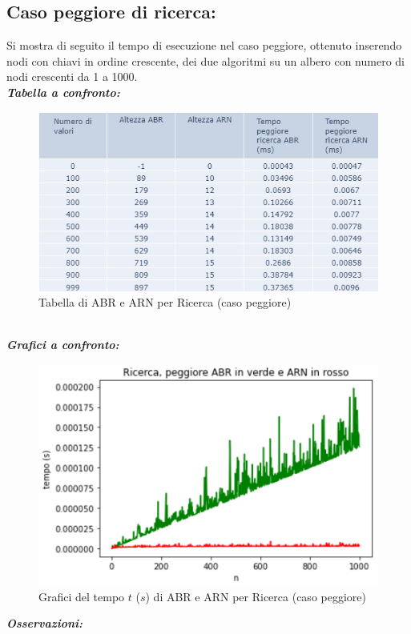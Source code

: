 \documentclass[]{article}
\begin{document}
\subsection {Caso peggiore di ricerca:} 
Si mostra di seguito il tempo di esecuzione nel caso peggiore, ottenuto inserendo nodi con chiavi in ordine crescente,  dei due algoritmi su un albero con numero di nodi crescenti da 1 a 1000. \\

\noindent \textit{\bf{Tabella a confronto:}} 
\begin{figure}[ht]
\centering
\includegraphics[]{TabellaPeggioreRicerca}
\caption{Tabella di ABR e ARN per Ricerca (caso peggiore)}
\label{fig:fig3}
\end{figure}
\\
\noindent \textit{\bf{Grafici a confronto:}}
\begin{figure}[ht]
\centering
\includegraphics[width=.7\textwidth, height=.6\textheight, keepaspectratio]{GraficoRicercaPeggiore}
\vspace{-5mm}
\caption{Grafici del tempo $t$ ($s$) di ABR e ARN per Ricerca (caso peggiore)}
\label{fig:fig4}
\end{figure}

\noindent \textit{\bf{Osservazioni:}} 
\end{document}
